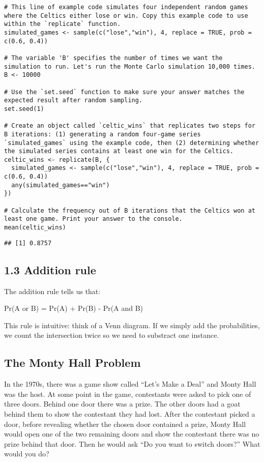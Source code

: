 \documentclass[
]{article}
\begin{document}
\begin{verbatim}
# This line of example code simulates four independent random games where the Celtics either lose or win. Copy this example code to use within the `replicate` function.
simulated_games <- sample(c("lose","win"), 4, replace = TRUE, prob = c(0.6, 0.4))

# The variable 'B' specifies the number of times we want the simulation to run. Let's run the Monte Carlo simulation 10,000 times.
B <- 10000

# Use the `set.seed` function to make sure your answer matches the expected result after random sampling.
set.seed(1)

# Create an object called `celtic_wins` that replicates two steps for B iterations: (1) generating a random four-game series `simulated_games` using the example code, then (2) determining whether the simulated series contains at least one win for the Celtics.
celtic_wins <- replicate(B, {
  simulated_games <- sample(c("lose","win"), 4, replace = TRUE, prob = c(0.6, 0.4))
  any(simulated_games=="win")
})

# Calculate the frequency out of B iterations that the Celtics won at least one game. Print your answer to the console.
mean(celtic_wins)
\end{verbatim}

\begin{verbatim}
## [1] 0.8757
\end{verbatim}

\hypertarget{addition-rule}{%
\subsection{1.3 Addition rule}\label{addition-rule}}

The addition rule tells us that:

Pr(A or B) = Pr(A) + Pr(B) - Pr(A and B)

This rule is intuitive: think of a Venn diagram. If we simply add the
probabilities, we count the intersection twice so we need to substract
one instance.

\hypertarget{the-monty-hall-problem}{%
\subsection{The Monty Hall Problem}\label{the-monty-hall-problem}}

In the 1970s, there was a game show called ``Let's Make a Deal'' and
Monty Hall was the host. At some point in the game, contestants were
asked to pick one of three doors. Behind one door there was a prize. The
other doors had a goat behind them to show the contestant they had lost.
After the contestant picked a door, before revealing whether the chosen
door contained a prize, Monty Hall would open one of the two remaining
doors and show the contestant there was no prize behind that door. Then
he would ask ``Do you want to switch doors?'' What would you do?
\end{document}
